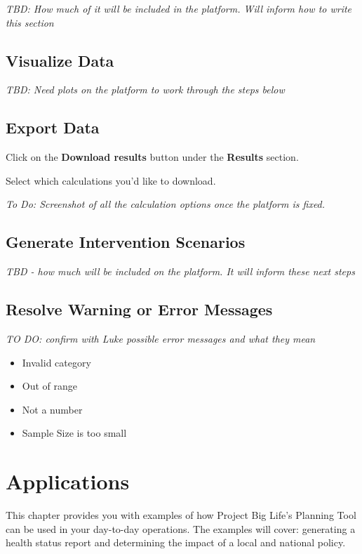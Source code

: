 \documentclass[]{book}
\providecommand{\tightlist}{%
  \setlength{\itemsep}{0pt}\setlength{\parskip}{0pt}}
\begin{document}
\emph{TBD: How much of it will be included in the platform. Will inform
how to write this section}

\section{Visualize Data}\label{visualize-data}

\emph{TBD: Need plots on the platform to work through the steps below}

\section{Export Data}\label{export-data}

Click on the \textbf{Download results} button under the \textbf{Results}
section.

Select which calculations you'd like to download.

\emph{To Do: Screenshot of all the calculation options once the platform
is fixed.}

\section{Generate Intervention
Scenarios}\label{generate-intervention-scenarios-1}

\emph{TBD - how much will be included on the platform. It will inform
these next steps}

\section{Resolve Warning or Error
Messages}\label{resolve-warning-or-error-messages}

\emph{TO DO: confirm with Luke possible error messages and what they
mean}

\begin{itemize}
\tightlist
\item
  Invalid category
\item
  Out of range
\item
  Not a number
\item
  Sample Size is too small
\end{itemize}

\chapter{Applications}\label{applications}

This chapter provides you with examples of how Project Big Life's
Planning Tool can be used in your day-to-day operations. The examples
will cover: generating a health status report and determining the impact
of a local and national policy.
\end{document}
